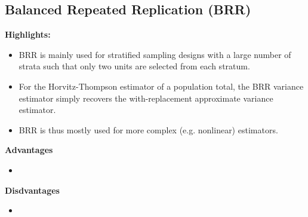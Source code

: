 

\subsection{Balanced Repeated Replication (BRR)}

\vskip 0.2cm
\textbf{Highlights:}
\begin{itemize}
\item
	BRR is mainly used for stratified sampling designs
	with a large number of strata such that only
	two units are selected from each stratum.
\item
	For the Horvitz-Thompson estimator of a population total,
	the BRR variance estimator simply recovers the
	with-replacement approximate variance estimator.
\item
	BRR is thus mostly used for more complex (e.g. nonlinear) estimators.
\end{itemize}

\vskip 0.5cm
\noindent
\textbf{Advantages}
\begin{itemize}
\item

\end{itemize}

\vskip 0.5cm
\noindent
\textbf{Disdvantages}
\begin{itemize}
\item

\end{itemize}

